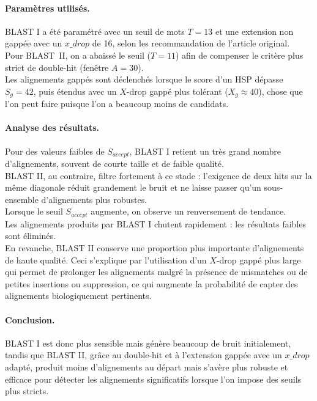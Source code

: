 \documentclass[conference]{IEEEtran}
\begin{document}
\paragraph*{Paramètres utilisés.}
BLAST I a été paramétré avec un seuil de mots $T=13$ et une extension non gappée avec un $x\_drop$ de 16, selon les recommandation de l'article original.\\
Pour BLAST~II, on a abaissé le seuil ($T=11$) afin de compenser le critère plus strict de double-hit (fenêtre $A=30$).\\
Les alignements gappés sont déclenchés lorsque le score d’un HSP dépasse $S_{g}=42$, puis étendus avec un $X$-drop gappé plus tolérant ($X_{g}\approx 40$), chose que l'on peut faire puisque l'on a beaucoup moins de candidats.

\paragraph*{Analyse des résultats.}
Pour des valeurs faibles de $S_{accept}$, BLAST I retient un très grand nombre d’alignements, souvent de courte taille et de faible qualité.\\
BLAST II, au contraire, filtre fortement à ce stade : l’exigence de deux hits sur la même diagonale réduit grandement le bruit et ne laisse passer qu’un sous-ensemble d’alignements plus robustes.\\
Lorsque le seuil $S_{accept}$ augmente, on observe un renversement de tendance.\\
Les alignements produits par BLAST I chutent rapidement : les résultats faibles sont éliminés.\\
En revanche, BLAST II conserve une proportion plus importante d’alignements de haute qualité. Ceci s’explique par l’utilisation d’un $X$-drop gappé plus large qui permet de prolonger les alignements malgré la présence de mismatches ou de petites insertions ou suppression, ce qui augmente la probabilité de capter des alignements biologiquement pertinents. 

\paragraph*{Conclusion.}
BLAST I est donc plus sensible mais génère beaucoup de bruit initialement, tandis que BLAST II, grâce au double-hit et à l’extension gappée avec un $x\_drop$ adapté, produit moins d’alignements au départ mais s’avère plus robuste et efficace pour détecter les alignements significatifs lorsque l’on impose des seuils plus stricts.
\end{document}
